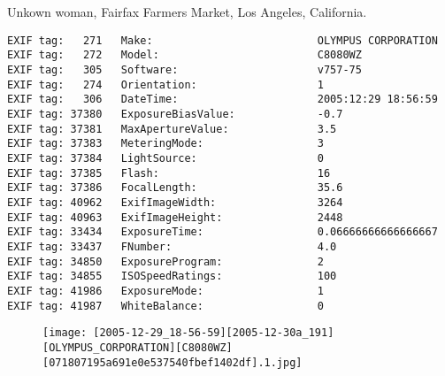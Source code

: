 \section{\protect{}}
\noindent Unkown woman, Fairfax Farmers Market, Los Angeles, California.
\noindent
\begin{lstlisting}
EXIF tag:   271   Make:                          OLYMPUS CORPORATION
EXIF tag:   272   Model:                         C8080WZ
EXIF tag:   305   Software:                      v757-75
EXIF tag:   274   Orientation:                   1
EXIF tag:   306   DateTime:                      2005:12:29 18:56:59
EXIF tag: 37380   ExposureBiasValue:             -0.7
EXIF tag: 37381   MaxApertureValue:              3.5
EXIF tag: 37383   MeteringMode:                  3
EXIF tag: 37384   LightSource:                   0
EXIF tag: 37385   Flash:                         16
EXIF tag: 37386   FocalLength:                   35.6
EXIF tag: 40962   ExifImageWidth:                3264
EXIF tag: 40963   ExifImageHeight:               2448
EXIF tag: 33434   ExposureTime:                  0.06666666666666667
EXIF tag: 33437   FNumber:                       4.0
EXIF tag: 34850   ExposureProgram:               2
EXIF tag: 34855   ISOSpeedRatings:               100
EXIF tag: 41986   ExposureMode:                  1
EXIF tag: 41987   WhiteBalance:                  0

\end{lstlisting}
\clearpage
\begin{figure}
\raggedleft
\texttt{[image: [2005-12-29\_18-56-59][2005-12-30a\_191][OLYMPUS\_CORPORATION][C8080WZ][071807195a691e0e537540fbef1402df].1.jpg]}
\end{figure}


\clearpage
